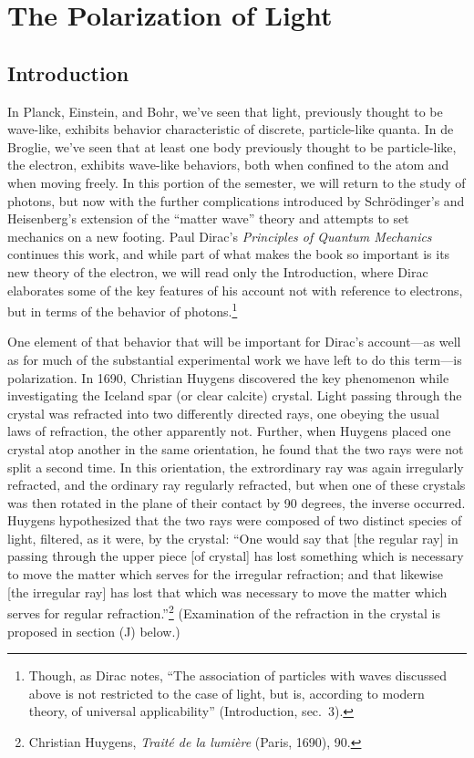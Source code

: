 \chapter{The Polarization of Light}



\section*{Introduction}

In Planck, Einstein, and Bohr, we’ve seen that light, previously thought to be wave-like, exhibits behavior characteristic of discrete, particle-like quanta. In de Broglie, we’ve seen that at least one body previously thought to be particle-like, the electron, exhibits wave-like behaviors, both when confined to the atom and when moving freely. In this portion of the semester, we will return to the study of photons, but now with the further complications introduced by Schr\"odinger’s and Heisenberg’s extension of the “matter wave” theory and attempts to set mechanics on a new footing. Paul Dirac’s \emph{Principles of Quantum Mechanics} continues this work, and while part of what makes the book so important is its new theory of the electron, we will read only the Introduction, where Dirac
elaborates some of the key features of his account not with reference to electrons, but in terms of the behavior of photons.\footnote{Though, as Dirac notes, ``The association of particles with waves discussed above is not
	restricted to the case of light, but is, according to modern theory, of universal applicability'' (Introduction, 
	sec.\ 3).}

One element of that behavior that will be important for Dirac’s account---as well as for much of the substantial 
experimental work we have left to do this term---is polarization. In 1690, Christian Huygens discovered 
the key phenomenon while investigating the Iceland spar (or clear calcite) crystal. Light passing through the
crystal was refracted into two differently directed rays, one obeying the usual laws of refraction, the other apparently not. 
Further, when Huygens placed one crystal atop another in the same orientation, he found that the two rays were not split a second time. In this orientation, the extrordinary ray was again irregularly refracted, and the ordinary ray regularly refracted, but when one of these crystals was then rotated in the plane of their contact by 90 degrees, the inverse occurred. Huygens hypothesized that the two rays were composed of two distinct species of light, filtered, as it were, by the crystal: ``One would say that [the regular ray] in passing through the upper piece [of crystal] has lost something which is necessary to move the matter which serves for the irregular refraction; and that likewise [the irregular ray] has lost that which was necessary to move the matter which serves for regular refraction.''\footnote{Christian Huygens, \emph{Trait\'e de la lumi\`ere} (Paris, 1690), 90.} (Examination of the refraction in the crystal is proposed in section (J) below.)

